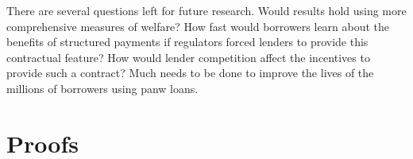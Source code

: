 \documentclass[12pt, a4paper]{article}
\begin{document}


There are several questions left for future research. Would results hold using more comprehensive measures of welfare? How fast would borrowers learn about the benefits of structured payments if regulators forced lenders to provide this contractual feature? How would lender competition affect the incentives to provide such a contract? Much needs to be done to improve the lives of the millions of borrowers using panw loans.

\begingroup
{}

%
%


\endgroup


\section{Proofs}
\label{sec:proofs}
\end{document}
